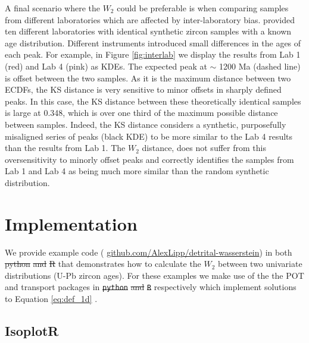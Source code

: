 \documentclass[gchron, manuscript]{copernicus}
\providecommand{\DIFaddtex}[1]{{\protect\color{blue}\uwave{#1}}} %
\providecommand{\DIFdeltex}[1]{{\protect\color{red}\sout{#1}}}                      %
\providecommand{\DIFaddbegin}{} %
\providecommand{\DIFaddend}{} %
\providecommand{\DIFdelbegin}{} %
\providecommand{\DIFdelend}{} %
\providecommand{\DIFadd}[1]{\texorpdfstring{\DIFaddtex{#1}}{#1}} %
\providecommand{\DIFdel}[1]{\texorpdfstring{\DIFdeltex{#1}}{}} %
\begin{document}
A final scenario where the $W_2$ could be preferable is when comparing samples from different laboratories which are affected by inter-laboratory bias. \citet{kosler_u-pb_2013} provided ten different laboratories with identical synthetic zircon samples with a known age distribution. Different instruments introduced small differences in the ages of each peak. For example, in Figure \ref{fig:interlab} we display the results from Lab 1 (red) and Lab 4 (pink) as KDEs. The expected peak at $\sim$ 1200 Ma (dashed line) is offset between the two samples. As it is the maximum distance between two ECDFs, the KS distance is very sensitive to minor offsets in sharply defined peaks. In this case, the KS distance between these theoretically identical samples is large at 0.348, which is over one third of the maximum possible distance between samples. Indeed, the KS distance considers a synthetic, purposefully misaligned series of peaks (black KDE) to be more similar to the Lab 4 results than the results from Lab 1. The $W_2$ distance, does not suffer from this oversensitivity to minorly offset peaks and correctly identifies the samples from Lab 1 and Lab 4 as being much more similar than the random synthetic distribution.   

\section{Implementation} 

We provide example code (\DIFdelbegin %
\DIFdelend \DIFaddbegin \href{https://github.com/AlexLipp/detrital-wasserstein}{\url{github.com/AlexLipp/detrital-wasserstein}}\DIFaddend ) in both \DIFdelbegin %
\DIFdel{python}%
\DIFdel{and }%
\DIFdel{R }%
\DIFdelend \DIFaddbegin \DIFadd{Python and R }\DIFaddend that demonstrates how to calculate the $W_2$ between two univariate distributions (U-Pb zircon ages). For these examples we make use of the the {\sf POT} and {\sf transport} packages in \DIFdelbegin \texttt{\DIFdel{python}} %
\DIFdel{and }\texttt{\DIFdel{R}} %
\DIFdelend \DIFaddbegin \DIFadd{Python and R }\DIFaddend respectively which implement solutions to Equation \ref{eq:def_1d} \citep{flamary_pot_2021,schuhmacher_transport_2022}.

\subsection{IsoplotR}
\end{document}
